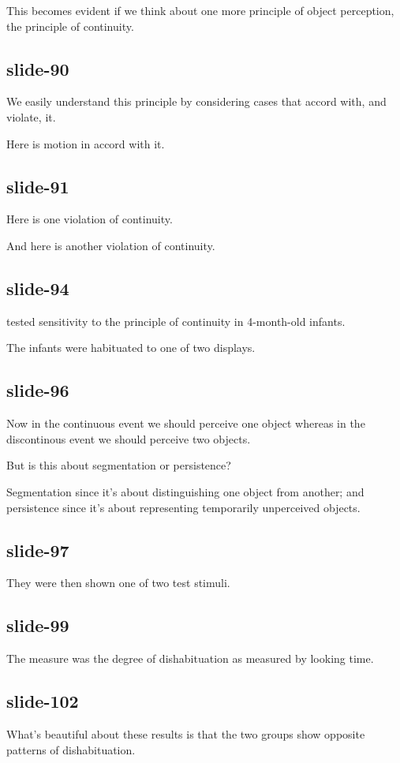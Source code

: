 \documentclass[12pt,\papersize]{extarticle}
\begin{document}
This becomes evident if we think about one more principle of object perception, the principle of continuity.
 
\subsection{slide-90}
We easily understand this principle by considering cases that accord with, and violate, it.
 
Here is motion in accord with it.
 
\subsection{slide-91}
Here is one violation of continuity.
 
And here is another violation of continuity.
 
\subsection{slide-94}
\citet{spelke:1995_spatiotemporal} tested sensitivity to the principle of continuity in 4-month-old infants.
 
The infants were habituated to one of two displays.
 
\subsection{slide-96}
Now in the continuous event we should perceive one object whereas in the discontinous event we should perceive two objects.
 
But is this about segmentation or persistence?
 
Segmentation since it's about distinguishing one object from another; 
 and persistence since it's about representing temporarily unperceived objects.
 
\subsection{slide-97}
They were then shown one of two test stimuli.
 
\subsection{slide-99}
The measure was the degree of dishabituation as measured by looking time.
 
\subsection{slide-102}
What's beautiful about these results is that the two groups show opposite patterns of dishabituation.
 
\end{document}
